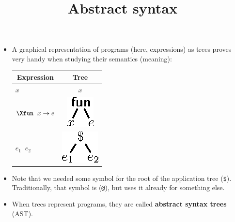 \documentclass[wide]{slides}
\begin{document}
\begin{slide}
  \title{Abstract syntax}

  \begin{itemize}

    \item A graphical representation of programs (here, expressions)
      as trees proves very handy when studying their semantics
      (meaning):
      \smallskip
      \begin{center}
        \begin{tabular}{l|c}
          \toprule
          \multicolumn{1}{c}{Expression}
          & \multicolumn{1}{c}{Tree}\\
          \toprule
          $x$
          & $x$\\
          $\Xfun \;\; x \rightarrow e$
          & \includegraphics[bb=72 697 93 721]{fun_tree.eps}\\
          $e_1 \;\; e_2$
          & \includegraphics[bb=72 695 101 720]{app_tree.eps}\\
          \bottomrule
        \end{tabular}
      \end{center}
      \smallskip

      \item Note that we needed some symbol for the root of the
        application tree (\texttt{\$}). Traditionally, that symbol is
        (\texttt{@}), but \OCaml uses it already for something else.

      \item When trees represent programs, they are called
        \textbf{abstract syntax trees} (AST).

  \end{itemize}

\end{slide}
\end{document}
